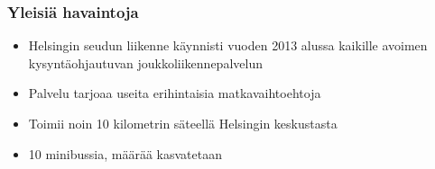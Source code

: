 \documentclass{beamer}
\begin{document}
\begin{frame}
  \frametitle{Yleisiä havaintoja}   %
\begin{itemize}
 \item 
Helsingin seudun liikenne käynnisti vuoden 2013 alussa kaikille avoimen kysyntäohjautuvan joukkoliikennepalvelun
\item
Palvelu tarjoaa useita erihintaisia matkavaihtoehtoja
\item
Toimii noin 10 kilometrin säteellä Helsingin keskustasta
\item
10 minibussia, määrää kasvatetaan
 \end{itemize}
\end{frame}


    
\end{document}
